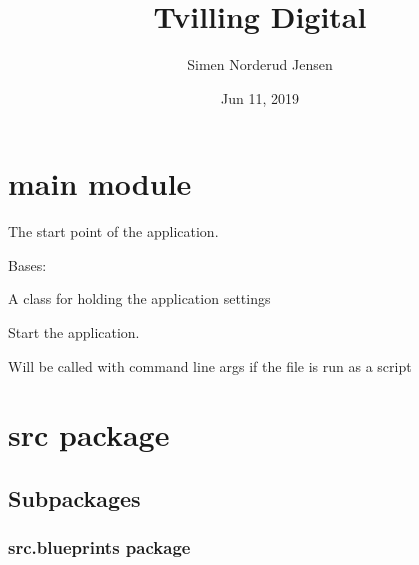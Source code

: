 \documentclass[letterpaper,10pt,english]{sphinxmanual}
\title{Tvilling Digital}
\date{Jun 11, 2019}
\author{Simen Norderud Jensen}
\begin{document}
\pagestyle{empty}
\sphinxmaketitle
\pagestyle{plain}
\sphinxtableofcontents
\pagestyle{normal}
\label{\detokenize{index::doc}}



\chapter{main module}
\label{\detokenize{main:module-main}}\label{\detokenize{main:main-module}}\label{\detokenize{main::doc}}
The start point of the application.

\begin{fulllineitems}
\label{\detokenize{main:main.Settings}}
Bases: 

A class for holding the application settings

\end{fulllineitems}


\begin{fulllineitems}
\label{\detokenize{main:main.main}}
Start the application.

Will be called with command line args if the file is run as a script

\end{fulllineitems}



\chapter{src package}
\label{\detokenize{src:src-package}}\label{\detokenize{src::doc}}

\section{Subpackages}
\label{\detokenize{src:subpackages}}

\subsection{src.blueprints package}
\label{\detokenize{src.blueprints:src-blueprints-package}}\label{\detokenize{src.blueprints::doc}}
\end{document}
